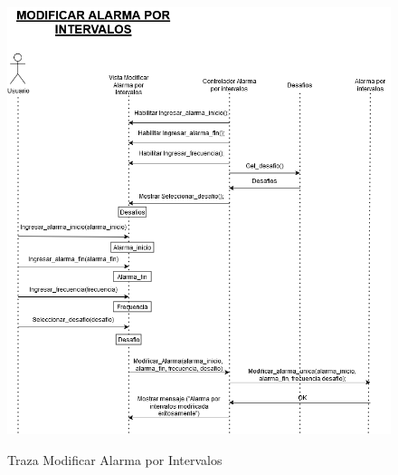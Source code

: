 \begin{figure}[H]
	\centering
	\caption{Traza Modificar Alarma por Intervalos}
	\includegraphics[width=\textwidth]{./img/Modificar_Alarma_Intervalos.png}
        \vspace{10pt}
	\label{fig:Traza Modificar Alarma por Intervalos}
\end{figure}

